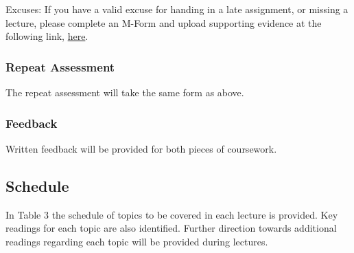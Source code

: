 \documentclass[
  x11names]{article}
\begin{document}
Excuses: If you have a valid excuse for handing in a late assignment, or
missing a lecture, please complete an M-Form and upload supporting
evidence at the following link,
\color{blue}\href{https://workflow.ul.ie/MForms/MForms/}{here}\color{black}.

\subsubsection{Repeat Assessment}\label{repeat-assessment}

The repeat assessment will take the same form as above.

\subsubsection{Feedback}\label{feedback}

Written feedback will be provided for both pieces of coursework.

\pagebreak

\subsection{Schedule}\label{schedule}

In Table 3 the schedule of topics to be covered in each lecture is
provided. Key readings for each topic are also identified. Further
direction towards additional readings regarding each topic will be
provided during lectures.
\end{document}

